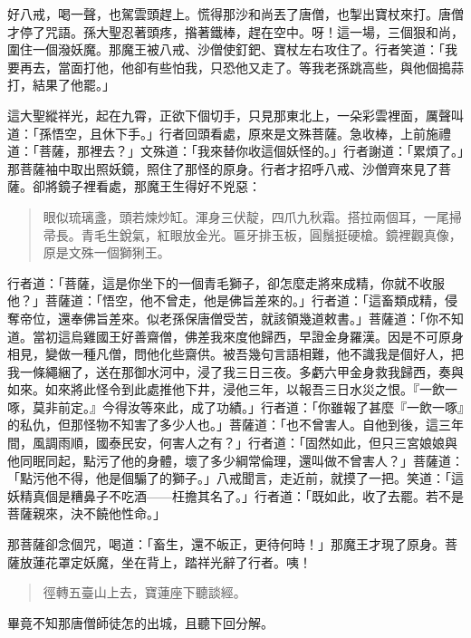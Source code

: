 好八戒，喝一聲，也駕雲頭趕上。慌得那沙和尚丟了唐僧，也掣出寶杖來打。唐僧才停了咒語。孫大聖忍著頭疼，揝著鐵棒，趕在空中。呀！這一場，三個狠和尚，圍住一個潑妖魔。那魔王被八戒、沙僧使釘鈀、寶杖左右攻住了。行者笑道：「我要再去，當面打他，他卻有些怕我，只恐他又走了。等我老孫跳高些，與他個搗蒜打，結果了他罷。」

這大聖縱祥光，起在九霄，正欲下個切手，只見那東北上，一朵彩雲裡面，厲聲叫道：「孫悟空，且休下手。」行者回頭看處，原來是文殊菩薩。急收棒，上前施禮道：「菩薩，那裡去？」文殊道：「我來替你收這個妖怪的。」行者謝道：「累煩了。」那菩薩袖中取出照妖鏡，照住了那怪的原身。行者才招呼八戒、沙僧齊來見了菩薩。卻將鏡子裡看處，那魔王生得好不兇惡：
\begin{quote}
眼似琉璃盞，頭若煉炒缸。渾身三伏靛，四爪九秋霜。搭拉兩個耳，一尾掃帚長。青毛生銳氣，紅眼放金光。匾牙排玉板，圓鬚挺硬槍。鏡裡觀真像，原是文殊一個獅猁王。
\end{quote}

行者道：「菩薩，這是你坐下的一個青毛獅子，卻怎麼走將來成精，你就不收服他？」菩薩道：「悟空，他不曾走，他是佛旨差來的。」行者道：「這畜類成精，侵奪帝位，還奉佛旨差來。似老孫保唐僧受苦，就該領幾道敕書。」菩薩道：「你不知道。當初這烏雞國王好善齋僧，佛差我來度他歸西，早證金身羅漢。因是不可原身相見，變做一種凡僧，問他化些齋供。被吾幾句言語相難，他不識我是個好人，把我一條繩綑了，送在那御水河中，浸了我三日三夜。多虧六甲金身救我歸西，奏與如來。如來將此怪令到此處推他下井，浸他三年，以報吾三日水災之恨。『一飲一啄，莫非前定。』今得汝等來此，成了功績。」行者道：「你雖報了甚麼『一飲一啄』的私仇，但那怪物不知害了多少人也。」菩薩道：「也不曾害人。自他到後，這三年間，風調雨順，國泰民安，何害人之有？」行者道：「固然如此，但只三宮娘娘與他同眠同起，點污了他的身體，壞了多少綱常倫理，還叫做不曾害人？」菩薩道：「點污他不得，他是個騸了的獅子。」八戒聞言，走近前，就摸了一把。笑道：「這妖精真個是糟鼻子不吃酒——枉擔其名了。」行者道：「既如此，收了去罷。若不是菩薩親來，決不饒他性命。」

那菩薩卻念個咒，喝道：「畜生，還不皈正，更待何時！」那魔王才現了原身。菩薩放蓮花罩定妖魔，坐在背上，踏祥光辭了行者。咦！
\begin{quote}
徑轉五臺山上去，寶蓮座下聽談經。
\end{quote}

畢竟不知那唐僧師徒怎的出城，且聽下回分解。

